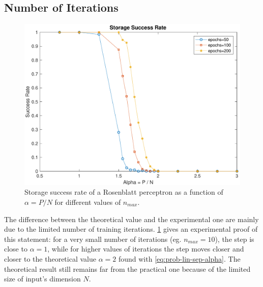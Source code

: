 \subsection{Number of Iterations}
\label{subsec:epochs}
\begin{figure}[t]
	\centering
	\includegraphics[width=\columnwidth]{figures/multiple_epochs}
    \caption{Storage success rate of a Rosenblatt perceptron as a function of $\alpha = P / N$ for different values of $n_{max}$.}
	\label{fig:multiple_epochs}
\end{figure}

The difference between the theoretical value and the experimental one are mainly due to the limited number of training iterations.
\cref{fig:multiple_epochs} gives an experimental proof of this statement:
for a very small number of iterations (eg. $n_{max} = 10$), the step is close to $\alpha = 1$, while for higher values of iterations the step moves closer and closer to the theoretical value $\alpha = 2$ found with \cref{eq:prob-lin-sep-alpha}.
The theoretical result still remains far from the practical one because of the limited size of input's dimension $N$.

